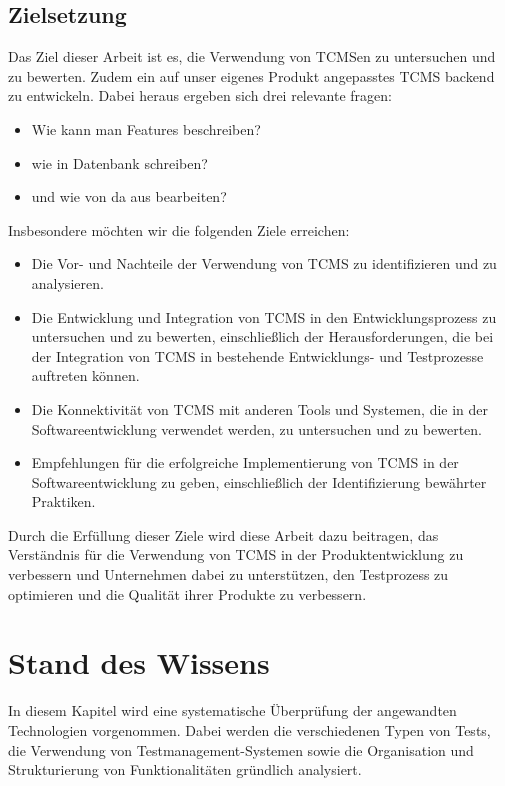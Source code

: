 \documentclass[a4paper, fontsize=11pt, parskip=half, twoside]{scrreprt}
\begin{document}
	\section{Zielsetzung}
	Das Ziel dieser Arbeit ist es, die Verwendung von \ac{TCMS}en zu untersuchen und zu bewerten. 
	Zudem ein auf unser eigenes Produkt angepasstes \ac{TCMS} backend zu entwickeln. 
	Dabei heraus ergeben sich drei relevante fragen:
	
	\begin{itemize}
		\item Wie kann man Features beschreiben? 
		\item wie in Datenbank schreiben? 
		\item und wie von da aus bearbeiten?
	\end{itemize}
	
	Insbesondere möchten wir die folgenden Ziele erreichen:
	
	\begin{itemize}
		\item Die Vor- und Nachteile der Verwendung von \ac{TCMS} zu identifizieren und zu analysieren.
		\item Die Entwicklung und Integration von \ac{TCMS} in den Entwicklungsprozess zu untersuchen und zu bewerten, einschließlich der Herausforderungen, die bei der Integration von \ac{TCMS} in bestehende Entwicklungs- und Testprozesse auftreten können.
		\item Die Konnektivität von \ac{TCMS} mit anderen Tools und Systemen, die in der Softwareentwicklung verwendet werden, zu untersuchen und zu bewerten.
		\item Empfehlungen für die erfolgreiche Implementierung von \ac{TCMS} in der Softwareentwicklung zu geben, einschließlich der Identifizierung bewährter Praktiken.
	\end{itemize}
	
	Durch die Erfüllung dieser Ziele wird diese Arbeit dazu beitragen, das Verständnis für die Verwendung von \ac{TCMS} in der Produktentwicklung zu verbessern und Unternehmen dabei zu unterstützen, den Testprozess zu optimieren und die Qualität ihrer Produkte zu verbessern.
	
	\chapter{Stand des Wissens} \label{sec:stateofart}
	In diesem Kapitel wird eine systematische Überprüfung der angewandten Technologien vorgenommen. 
	Dabei werden die verschiedenen Typen von Tests, die Verwendung von Testmanagement-Systemen sowie die Organisation und Strukturierung von Funktionalitäten gründlich analysiert.
	
\end{document}
